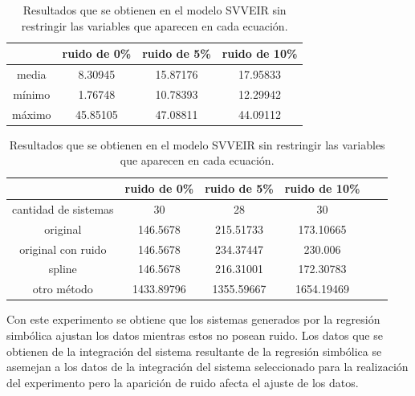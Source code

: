 \begin{table}[!h]
    \centering
    \caption{Resultados que se obtienen en el modelo SVVEIR sin restringir las variables que aparecen en cada ecuación.}
    \begin{tabular}{|c|c|c|c|}
        \hline
               & \textbf{ruido de 0\%} & \textbf{ruido de 5\%} & \textbf{ruido de 10\%} \\
        \hline
        media  & 8.30945               & 15.87176              & 17.95833               \\
        \hline
        mínimo & 1.76748               & 10.78393              & 12.29942               \\
        \hline
        máximo & 45.85105              & 47.08811              & 44.09112               \\
        \hline
    \end{tabular}

    \begin{tabular}{|c|c|c|c|c|c|}
        \hline
                             & \textbf{ruido de 0\%} & \textbf{ruido de 5\%} & \textbf{ruido de 10\%} \\
        \hline
        cantidad de sistemas & 30                    & 28                    & 30                     \\
        \hline
        original             & 146.5678              & 215.51733             & 173.10665              \\
        \hline
        original con ruido   & 146.5678              & 234.37447             & 230.006                \\
        \hline
        spline               & 146.5678              & 216.31001             & 172.30783              \\
        \hline
        otro método          & 1433.89796            & 1355.59667            & 1654.19469             \\
        \hline
    \end{tabular}
    \label{table:experiment_SVVEIR_all}
\end{table}

Con este experimento se obtiene que los sistemas generados por la regresión simbólica ajustan los datos mientras estos no posean ruido. Los datos que se obtienen de la integración del sistema resultante de la regresión simbólica se asemejan a los datos de la integración del sistema seleccionado para la realización del experimento pero la aparición de ruido afecta el ajuste de los datos.

